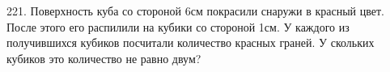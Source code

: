 221. Поверхность куба со стороной 6см покрасили снаружи в красный цвет. После этого его распилили на кубики со стороной 1см. У каждого из получившихся кубиков посчитали количество красных граней. У скольких кубиков это количество не равно двум?\\
